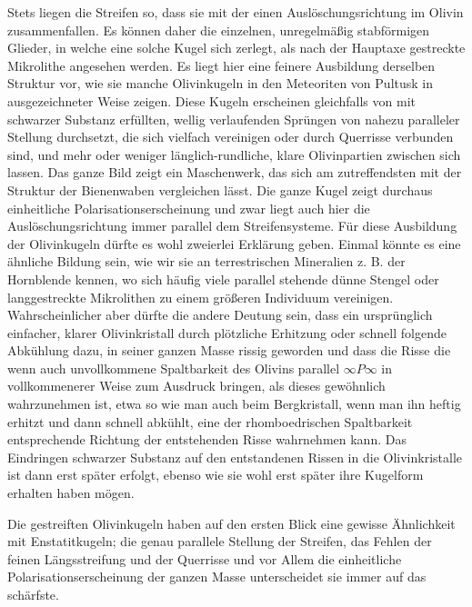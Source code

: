 \documentclass[a4paper, 11pt, oneside]{article}
\begin{document}
Stets liegen die Streifen so, dass sie mit der einen Auslöschungsrichtung im Olivin zusammenfallen. Es können daher die einzelnen, unregelmäßig stabförmigen Glieder, in welche eine solche Kugel sich zerlegt, als nach der Hauptaxe gestreckte Mikrolithe angesehen werden. Es liegt hier eine feinere Ausbildung derselben Struktur vor, wie sie manche Olivinkugeln in den Meteoriten von Pultusk in ausgezeichneter Weise zeigen. Diese Kugeln erscheinen gleichfalls von mit schwarzer Substanz erfüllten, wellig verlaufenden Sprüngen von nahezu paralleler Stellung durchsetzt, die sich vielfach vereinigen oder durch Querrisse verbunden sind, und mehr oder weniger länglich-rundliche, klare Olivinpartien zwischen sich lassen. Das ganze Bild zeigt ein Maschenwerk, das sich am zutreffendsten mit der Struktur der Bienenwaben vergleichen lässt. Die ganze Kugel zeigt durchaus einheitliche Polarisationserscheinung und zwar liegt auch hier die Auslöschungsrichtung immer parallel dem Streifensysteme. Für diese Ausbildung der Olivinkugeln dürfte es wohl zweierlei Erklärung geben. Einmal könnte es eine ähnliche Bildung sein, wie wir sie an terrestrischen Mineralien z. B. der Hornblende kennen, wo sich häufig viele parallel stehende dünne Stengel oder langgestreckte Mikrolithen zu einem größeren Individuum vereinigen. Wahrscheinlicher aber dürfte die andere Deutung sein, dass ein ursprünglich einfacher, klarer Olivinkristall durch plötzliche Erhitzung oder schnell folgende Abkühlung dazu, in seiner ganzen Masse rissig geworden und dass die Risse die wenn auch unvollkommene Spaltbarkeit des Olivins parallel $\infty P \infty$ in vollkommenerer Weise zum Ausdruck bringen, als dieses gewöhnlich wahrzunehmen ist, etwa so wie man auch beim Bergkristall, wenn man ihn heftig erhitzt und dann schnell abkühlt, eine der rhomboedrischen Spaltbarkeit entsprechende Richtung der entstehenden Risse wahrnehmen kann. Das Eindringen schwarzer Substanz auf den entstandenen Rissen in die Olivinkristalle ist dann erst später erfolgt, ebenso wie sie wohl erst später ihre Kugelform erhalten haben mögen.

Die gestreiften Olivinkugeln haben auf den ersten Blick eine gewisse Ähnlichkeit mit Enstatitkugeln; die genau parallele Stellung der Streifen, das Fehlen der feinen Längsstreifung und der Querrisse und vor Allem die einheitliche Polarisationserscheinung der ganzen Masse unterscheidet sie immer auf das schärfste.
\end{document}
